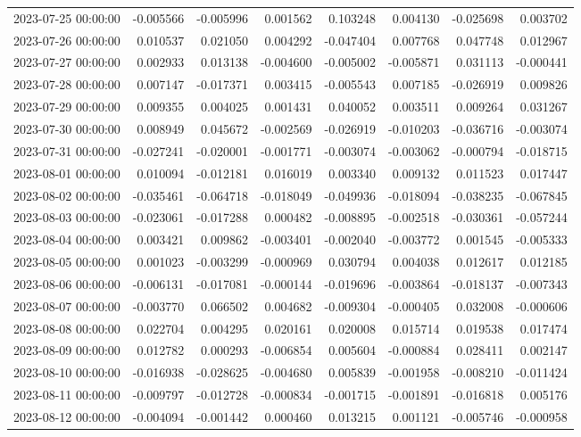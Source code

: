 \begin{tabular}{lrrrrrrr}
2023-07-25 00:00:00 & -0.005566 & -0.005996 & 0.001562 & 0.103248 & 0.004130 & -0.025698 & 0.003702 \\
2023-07-26 00:00:00 & 0.010537 & 0.021050 & 0.004292 & -0.047404 & 0.007768 & 0.047748 & 0.012967 \\
2023-07-27 00:00:00 & 0.002933 & 0.013138 & -0.004600 & -0.005002 & -0.005871 & 0.031113 & -0.000441 \\
2023-07-28 00:00:00 & 0.007147 & -0.017371 & 0.003415 & -0.005543 & 0.007185 & -0.026919 & 0.009826 \\
2023-07-29 00:00:00 & 0.009355 & 0.004025 & 0.001431 & 0.040052 & 0.003511 & 0.009264 & 0.031267 \\
2023-07-30 00:00:00 & 0.008949 & 0.045672 & -0.002569 & -0.026919 & -0.010203 & -0.036716 & -0.003074 \\
2023-07-31 00:00:00 & -0.027241 & -0.020001 & -0.001771 & -0.003074 & -0.003062 & -0.000794 & -0.018715 \\
2023-08-01 00:00:00 & 0.010094 & -0.012181 & 0.016019 & 0.003340 & 0.009132 & 0.011523 & 0.017447 \\
2023-08-02 00:00:00 & -0.035461 & -0.064718 & -0.018049 & -0.049936 & -0.018094 & -0.038235 & -0.067845 \\
2023-08-03 00:00:00 & -0.023061 & -0.017288 & 0.000482 & -0.008895 & -0.002518 & -0.030361 & -0.057244 \\
2023-08-04 00:00:00 & 0.003421 & 0.009862 & -0.003401 & -0.002040 & -0.003772 & 0.001545 & -0.005333 \\
2023-08-05 00:00:00 & 0.001023 & -0.003299 & -0.000969 & 0.030794 & 0.004038 & 0.012617 & 0.012185 \\
2023-08-06 00:00:00 & -0.006131 & -0.017081 & -0.000144 & -0.019696 & -0.003864 & -0.018137 & -0.007343 \\
2023-08-07 00:00:00 & -0.003770 & 0.066502 & 0.004682 & -0.009304 & -0.000405 & 0.032008 & -0.000606 \\
2023-08-08 00:00:00 & 0.022704 & 0.004295 & 0.020161 & 0.020008 & 0.015714 & 0.019538 & 0.017474 \\
2023-08-09 00:00:00 & 0.012782 & 0.000293 & -0.006854 & 0.005604 & -0.000884 & 0.028411 & 0.002147 \\
2023-08-10 00:00:00 & -0.016938 & -0.028625 & -0.004680 & 0.005839 & -0.001958 & -0.008210 & -0.011424 \\
2023-08-11 00:00:00 & -0.009797 & -0.012728 & -0.000834 & -0.001715 & -0.001891 & -0.016818 & 0.005176 \\
2023-08-12 00:00:00 & -0.004094 & -0.001442 & 0.000460 & 0.013215 & 0.001121 & -0.005746 & -0.000958 \\

\end{tabular}
